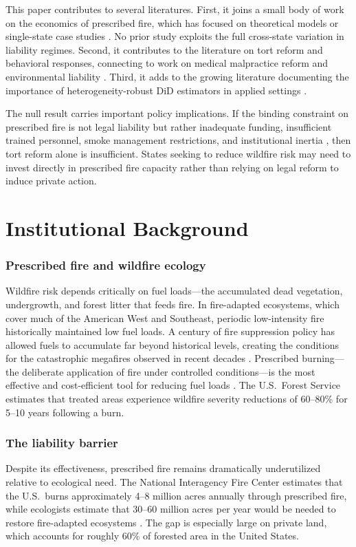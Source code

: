 \documentclass[12pt]{article}
\begin{document}
This paper contributes to several literatures. First, it joins a small body of work on the economics of prescribed fire, which has focused on theoretical models \citep{Yoder2004} or single-state case studies \citep{Phillips2020}. No prior study exploits the full cross-state variation in liability regimes. Second, it contributes to the literature on tort reform and behavioral responses, connecting to work on medical malpractice reform \citep{Kessler1996, CurrieMacLeod2008} and environmental liability \citep{Alberini2016}. Third, it adds to the growing literature documenting the importance of heterogeneity-robust DiD estimators in applied settings \citep{Sun2021, Roth2023, BakerLW2022}.

The null result carries important policy implications. If the binding constraint on prescribed fire is not legal liability but rather inadequate funding, insufficient trained personnel, smoke management restrictions, and institutional inertia \citep{Kolden2019, Schultz2019}, then tort reform alone is insufficient. States seeking to reduce wildfire risk may need to invest directly in prescribed fire capacity rather than relying on legal reform to induce private action.

\section{Institutional Background}

\subsubsection*{Prescribed fire and wildfire ecology} Wildfire risk depends critically on fuel loads---the accumulated dead vegetation, undergrowth, and forest litter that feeds fire. In fire-adapted ecosystems, which cover much of the American West and Southeast, periodic low-intensity fire historically maintained low fuel loads. A century of fire suppression policy has allowed fuels to accumulate far beyond historical levels, creating the conditions for the catastrophic megafires observed in recent decades \citep{Pyne1997, North2015, Parks2016}. Prescribed burning---the deliberate application of fire under controlled conditions---is the most effective and cost-efficient tool for reducing fuel loads \citep{FernandezAnez2021}. The U.S.\ Forest Service estimates that treated areas experience wildfire severity reductions of 60--80\% for 5--10 years following a burn.

\subsubsection*{The liability barrier} Despite its effectiveness, prescribed fire remains dramatically underutilized relative to ecological need. The National Interagency Fire Center estimates that the U.S.\ burns approximately 4--8 million acres annually through prescribed fire, while ecologists estimate that 30--60 million acres per year would be needed to restore fire-adapted ecosystems \citep{Kolden2019}. The gap is especially large on private land, which accounts for roughly 60\% of forested area in the United States.
\end{document}
